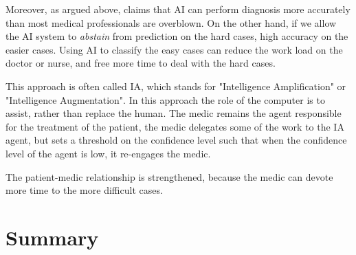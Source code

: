 \documentclass[fleqn,10pt]{wlscirep}
\begin{document}
Moreover, as argued above, claims that AI can perform diagnosis more accurately than most medical professionals are overblown. On the other hand, if we allow the AI system to {\em abstain} from prediction on the hard cases, high accuracy on the easier cases. Using AI to classify the easy cases can reduce the work load on the doctor or nurse, and free more time to deal with the hard cases.

This approach is often called IA, which stands for "Intelligence Amplification" or "Intelligence Augmentation". In this approach the role of the computer is to assist, rather than replace the human.  The medic remains the agent responsible for the treatment of the patient, the medic delegates some of the work to the IA agent, but sets a threshold on the confidence level such that when the confidence level of the agent is low, it re-engages the medic.

The patient-medic relationship is strengthened, because the medic can devote more time to the more difficult cases.

\section{Summary}

 


\end{document}

